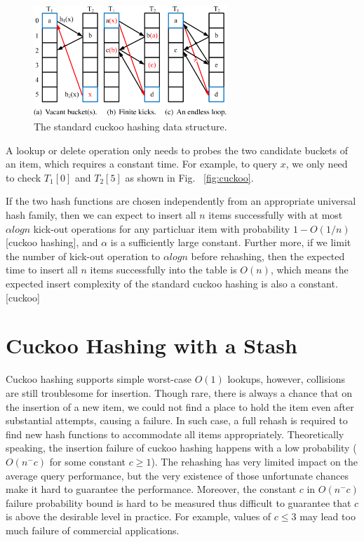 \documentclass[runningheads]{llncs}
\begin{document}
\begin{figure}
    \centering
    \includegraphics[width=0.65\textwidth]{fig1.png}
    \caption{The standard cuckoo hashing data structure.
    } \label{fig:cuckoo-example}
\end{figure}

A lookup or delete operation only needs to probes the two candidate buckets of an item, which requires a constant time. For example, to query $x$, we only need to check $T_1[0]$ and $T_2[5]$ as shown in Fig. ~\ref{fig:cuckoo}.

If the two hash functions are chosen independently from an appropriate universal hash family, then we can expect to insert all $n$ items successfully with at most $\alpha logn$ kick-out operations for any particluar item with probability $1-O(1/n)$[cuckoo hashing], and $\alpha$ is a sufficiently large constant. Further more, if we limit the number of kick-out operation to $\alpha logn$ before rehashing, then the expected time to insert all $n$ items successfully into the table is $O(n)$, which means the expected insert complexity of the standard cuckoo hashing is also a constant.[cuckoo]

\section{Cuckoo Hashing with a Stash}
\label{sec:chs}
Cuckoo hashing supports simple worst-case $O(1)$ lookups, however, collisions are still troublesome for insertion. Though rare, there is always a chance that on the insertion of a new item, we could not find a place to hold the item even after substantial attempts, causing a failure. In such case, a full rehash is required to find new hash functions to accommodate all items appropriately. Theoretically speaking, the insertion failure of cuckoo hashing happens with a low probability ($O(n^-c)$ for some constant $c\geq 1$). The rehashing has very limited impact on the average query performance, but the very existence of those unfortunate chances make it hard to guarantee the performance. Moreover, the constant $c$ in $O(n^-c)$ failure probability bound is hard to be measured thus difficult to guarantee that $c$ is above the desirable level in practice. For example, values of $c\leq3$ may lead too much failure of commercial applications.
\end{document}
